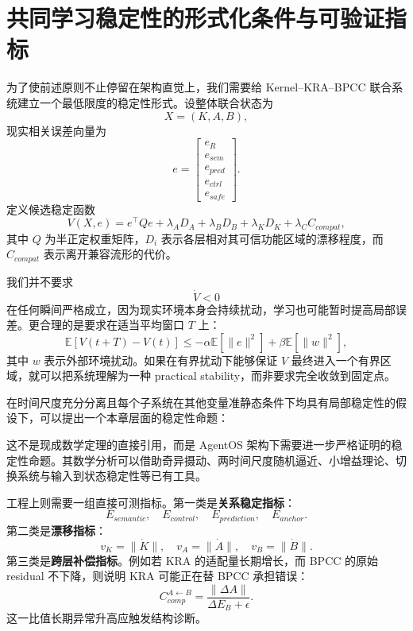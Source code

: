 \section{共同学习稳定性的形式化条件与可验证指标}

为了使前述原则不止停留在架构直觉上，我们需要给 Kernel--KRA--BPCC 联合系统建立一个最低限度的稳定性形式。设整体联合状态为
\[
X
=
(K,A,B),
\]
现实相关误差向量为
\[
e
=
\begin{bmatrix}
e_R\\
e_{sem}\\
e_{pred}\\
e_{ctrl}\\
e_{safe}
\end{bmatrix}.
\]
定义候选稳定函数
\[
V(X,e)
=
e^\top Q e
+
\lambda_A D_A
+
\lambda_B D_B
+
\lambda_K D_K
+
\lambda_C C_{compat},
\]
其中 $Q$ 为半正定权重矩阵，$D_i$ 表示各层相对其可信功能区域的漂移程度，而 $C_{compat}$ 表示离开兼容流形的代价。

我们并不要求
\[
\dot V<0
\]
在任何瞬间严格成立，因为现实环境本身会持续扰动，学习也可能暂时提高局部误差。更合理的是要求在适当平均窗口 $T$ 上：
\[
\boxed{
\mathbb E
\left[
V(t+T)-V(t)
\right]
\leq
-\alpha
\mathbb E
\left[
\|e\|^2
\right]
+
\beta
\mathbb E
\left[
\|w\|^2
\right],
}
\]
其中 $w$ 表示外部环境扰动。如果在有界扰动下能够保证 $V$ 最终进入一个有界区域，就可以把系统理解为一种 practical stability，而非要求完全收敛到固定点。

在时间尺度充分分离且每个子系统在其他变量准静态条件下均具有局部稳定性的假设下，可以提出一个本章层面的稳定性命题：

\begin{statementbox}
\centering
{}
\end{statementbox}

这不是现成数学定理的直接引用，而是 AgentOS 架构下需要进一步严格证明的稳定性命题。其数学分析可以借助奇异摄动、两时间尺度随机逼近、小增益理论、切换系统与输入到状态稳定性等已有工具。

工程上则需要一组直接可测指标。第一类是\textbf{关系稳定指标}：
\[
E_{semantic},
\quad
E_{control},
\quad
E_{prediction},
\quad
E_{anchor}.
\]
第二类是\textbf{漂移指标}：
\[
v_K=\|\dot K\|,
\quad
v_A=\|\dot A\|,
\quad
v_B=\|\dot B\|.
\]
第三类是\textbf{跨层补偿指标}。例如若 KRA 的适配量长期增长，而 BPCC 的原始 residual 不下降，则说明 KRA 可能正在替 BPCC 承担错误：
\[
C_{comp}^{A\leftarrow B}
=
\frac{
\|\Delta A\|
}{
\Delta E_B+\epsilon
}.
\]
这一比值长期异常升高应触发结构诊断。

